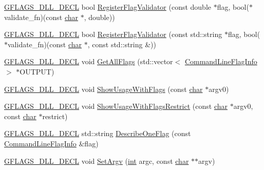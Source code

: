 \begin{DoxyCompactItemize}
\item 
\hyperlink{gflags__declare_8h_ab630d48e0b993f39ca96b0c4401f01cf}{G\+F\+L\+A\+G\+S\+\_\+\+D\+L\+L\+\_\+\+D\+E\+CL} bool \hyperlink{namespaceGFLAGS__NAMESPACE_abde621581f5723f4d194845d7c5f4a10}{Register\+Flag\+Validator} (const double $\ast$flag, bool($\ast$validate\+\_\+fn)(const \hyperlink{CMakeCache_8txt_afe71f11dacb15682cdc012f7208e6e09}{char} $\ast$, double))
\item 
\hyperlink{gflags__declare_8h_ab630d48e0b993f39ca96b0c4401f01cf}{G\+F\+L\+A\+G\+S\+\_\+\+D\+L\+L\+\_\+\+D\+E\+CL} bool \hyperlink{namespaceGFLAGS__NAMESPACE_ab9508fafc50f115c1554d9c9bae8c04b}{Register\+Flag\+Validator} (const std\+::string $\ast$flag, bool($\ast$validate\+\_\+fn)(const \hyperlink{CMakeCache_8txt_afe71f11dacb15682cdc012f7208e6e09}{char} $\ast$, const std\+::string \&))
\item 
\hyperlink{gflags__declare_8h_ab630d48e0b993f39ca96b0c4401f01cf}{G\+F\+L\+A\+G\+S\+\_\+\+D\+L\+L\+\_\+\+D\+E\+CL} void \hyperlink{namespaceGFLAGS__NAMESPACE_ae1f8d83ef21f4b5f7e2af46b1c9bcbd5}{Get\+All\+Flags} (std\+::vector$<$ \hyperlink{structGFLAGS__NAMESPACE_1_1CommandLineFlagInfo}{Command\+Line\+Flag\+Info} $>$ $\ast$O\+U\+T\+P\+UT)
\item 
\hyperlink{gflags__declare_8h_ab630d48e0b993f39ca96b0c4401f01cf}{G\+F\+L\+A\+G\+S\+\_\+\+D\+L\+L\+\_\+\+D\+E\+CL} void \hyperlink{namespaceGFLAGS__NAMESPACE_a310cea23d848e811a732f473aa0ed6b0}{Show\+Usage\+With\+Flags} (const \hyperlink{CMakeCache_8txt_afe71f11dacb15682cdc012f7208e6e09}{char} $\ast$argv0)
\item 
\hyperlink{gflags__declare_8h_ab630d48e0b993f39ca96b0c4401f01cf}{G\+F\+L\+A\+G\+S\+\_\+\+D\+L\+L\+\_\+\+D\+E\+CL} void \hyperlink{namespaceGFLAGS__NAMESPACE_aad17234ebace18731c53ea6cf8100148}{Show\+Usage\+With\+Flags\+Restrict} (const \hyperlink{CMakeCache_8txt_afe71f11dacb15682cdc012f7208e6e09}{char} $\ast$argv0, const \hyperlink{CMakeCache_8txt_afe71f11dacb15682cdc012f7208e6e09}{char} $\ast$restrict)
\item 
\hyperlink{gflags__declare_8h_ab630d48e0b993f39ca96b0c4401f01cf}{G\+F\+L\+A\+G\+S\+\_\+\+D\+L\+L\+\_\+\+D\+E\+CL} std\+::string \hyperlink{namespaceGFLAGS__NAMESPACE_af825766ad0b38e2b0d81e3dc01f1b6ba}{Describe\+One\+Flag} (const \hyperlink{structGFLAGS__NAMESPACE_1_1CommandLineFlagInfo}{Command\+Line\+Flag\+Info} \&flag)
\item 
\hyperlink{gflags__declare_8h_ab630d48e0b993f39ca96b0c4401f01cf}{G\+F\+L\+A\+G\+S\+\_\+\+D\+L\+L\+\_\+\+D\+E\+CL} void \hyperlink{namespaceGFLAGS__NAMESPACE_a56efe1ece8853bb7feca32a34a5530e3}{Set\+Argv} (\hyperlink{CMakeCache_8txt_a79a3d8790b2588b09777910863574e09}{int} argc, const \hyperlink{CMakeCache_8txt_afe71f11dacb15682cdc012f7208e6e09}{char} $\ast$$\ast$argv)
$$
\end{DoxyCompactItemize}
